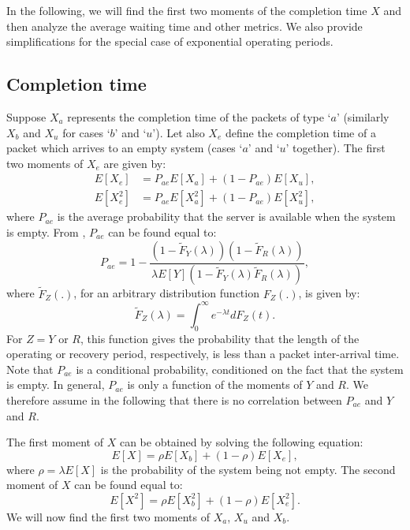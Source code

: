 \documentclass[11pt,journal,oneside,onecolumn,draftclsnofoot]{IEEEtran}
\begin{document}
In the following, we will find the first two moments of the completion time $X$ and then analyze the average waiting time and other metrics. We also provide simplifications for the special case of exponential operating periods.
 

\subsection{Completion time}

Suppose $X_a$ represents the completion time of the packets of type `$a$' (similarly $X_b$ and $X_u$ for cases `$b$' and `$u$'). Let also $X_e$ define the completion time of a packet which arrives to an empty system (cases `$a$' and `$u$' together). The first two moments of $X_e$ are given by:
\begin{align}
E[X_e] &=P_{ae}E[X_a] + (1-P_{ae})E[X_u], \\
E[X_e^2] &=P_{ae}E[X_a^2] + (1-P_{ae})E[X_u^2],
\label{eq:}
\end{align}
where $P_{ae}$ is the average probability that the server is available when the system is empty. From \cite{federgruen86}, $P_{ae}$ can be found equal to:
\begin{equation}
P_{ae}=1-\frac{(1-\widetilde{F}_Y(\lambda))(1-\widetilde{F}_R(\lambda))}{\lambda E[Y] (1-\widetilde{F}_Y(\lambda)\widetilde{F}_R(\lambda))},
\label{eq:Pae}
\end{equation}
where $\widetilde{F}_Z(.)$, for an arbitrary distribution function $F_Z(.)$, is given by:
\begin{equation}
\widetilde{F}_Z(\lambda)=\int_{0}^{\infty}{e^{-\lambda t}dF_Z(t)}.
\label{eq:tilda-function}
\end{equation}
For $Z=Y$ or $R$, this function gives the probability that the length of the operating or recovery period, respectively, is less than a packet inter-arrival time. Note that $P_{ae}$ is a conditional probability, conditioned on the fact that the system is empty. In general, $P_{ae}$ is only a function of the  moments of $Y$ and $R$. We therefore assume in the following that there is no correlation between $P_{ae}$ and $Y$ and $R$.  

The first moment of $X$ can be obtained by solving the following equation: 
\begin{equation}
E[X]=\rho E[X_b] + (1-\rho)E[X_e],
\label{eq:How-to-findEX}
\end{equation}
where $\rho=\lambda E[X]$ is the probability of the system being not empty.
The second moment of $X$ can be found equal to:
\begin{equation}
E[X^{2}]=\rho E[X^2_b] + (1-\rho)E[X^{2}_e].
\label{eq:Xe}
\end{equation}
We will now find the first two moments of $X_a$, $X_u$ and $X_b$.
\end{document}
